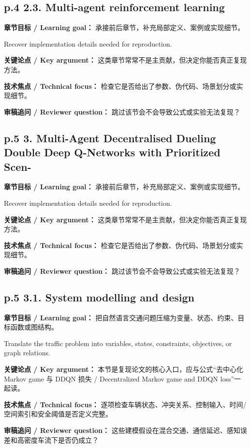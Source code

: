 \documentclass[UTF8,a4paper,11pt,fontset=fandol]{ctexart}
\begin{document}
\subsection*{p.4 2.3. Multi-agent reinforcement learning}
\textbf{章节目标 / Learning goal：} 承接前后章节，补充局部定义、案例或实现细节。

Recover implementation details needed for reproduction.

\textbf{关键论点 / Key argument：} 这类章节常常不是主贡献，但决定你能否真正复现方法。

\textbf{技术焦点 / Technical focus：} 检查它是否给出了参数、伪代码、场景划分或实现细节。

\textbf{审稿追问 / Reviewer question：} 跳过该节会不会导致公式或实验无法复现？

\subsection*{p.5 3. Multi-Agent Decentralised Dueling Double Deep Q-Networks with Prioritized Scen-}
\textbf{章节目标 / Learning goal：} 承接前后章节，补充局部定义、案例或实现细节。

Recover implementation details needed for reproduction.

\textbf{关键论点 / Key argument：} 这类章节常常不是主贡献，但决定你能否真正复现方法。

\textbf{技术焦点 / Technical focus：} 检查它是否给出了参数、伪代码、场景划分或实现细节。

\textbf{审稿追问 / Reviewer question：} 跳过该节会不会导致公式或实验无法复现？

\subsection*{p.5 3.1. System modelling and design}
\textbf{章节目标 / Learning goal：} 把自然语言交通问题压缩为变量、状态、约束、目标函数或图结构。

Translate the traffic problem into variables, states, constraints, objectives, or graph relations.

\textbf{关键论点 / Key argument：} 本节是复现论文的核心入口，应与公式“去中心化 Markov game 与 DDQN 损失 / Decentralized Markov game and DDQN loss”一起读。

\textbf{技术焦点 / Technical focus：} 逐项检查车辆状态、冲突关系、控制输入、时间/空间索引和安全阈值是否定义完整。

\textbf{审稿追问 / Reviewer question：} 这些建模假设在混合交通、通信延迟、感知误差和高密度车流下是否仍成立？
\end{document}
